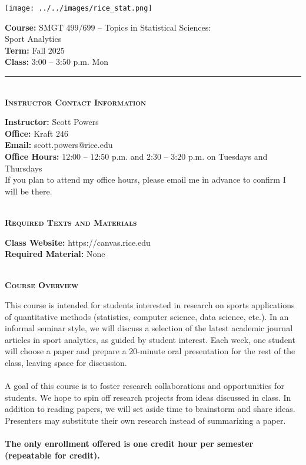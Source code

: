 \documentclass[11pt]{article}
\begin{document}
\begin{minipage}[c]{0.4\linewidth}
  \texttt{[image: ../../images/rice\_stat.png]}
\end{minipage}
\begin{minipage}[c]{0.6\linewidth}
  \raggedleft
  {\bf Course:} SMGT $499/699$ -- Topics in Statistical Sciences:\\
  Sport Analytics\\
  {\bf Term:} Fall $2025$\\
  {\bf Class:} $3$:$00$ -- $3$:$50$ p.m. Mon
\end{minipage}

\hrule

~\\
\textbf{\textsc{Instructor Contact Information}}
\begin{adjustwidth}{1cm}{0cm}
	{\bf Instructor:} Scott Powers\\
  {\bf Office:} Kraft $246$\\
  {\bf Email:} scott.powers@rice.edu\\
  {\bf Office Hours:} $12$:$00$ -- $12$:$50$ p.m. and $2$:$30$ -- $3$:$20$ p.m. on Tuesdays and Thursdays\\
  If you plan to attend my office hours, please email me in advance to confirm I will be there.
\end{adjustwidth}

~\\
\textbf{\textsc{Required Texts and Materials}}
\begin{adjustwidth}{1cm}{0cm}
	{\bf Class Website:} https://canvas.rice.edu\\
	{\bf Required Material:} None
\end{adjustwidth}

~\\
\textbf{\textsc{Course Overview}}
\begin{adjustwidth}{1cm}{0cm}
  This course is intended for students interested in research on sports applications of quantitative methods (statistics, computer science, data science, etc.). In an informal seminar style, we will discuss a selection of the latest academic journal articles in sport analytics, as guided by student interest. Each week, one student will choose a paper and prepare a 20-minute oral presentation for the rest of the class, leaving space for discussion.\\
  ~\\
  A goal of this course is to foster research collaborations and opportunities for students. We hope to spin off research projects from ideas discussed in class. In addition to reading papers, we will set aside time to brainstorm and share ideas. Presenters may substitute their own research instead of summarizing a paper.\\
  ~\\
  {\bf The only enrollment offered is one credit hour per semester (repeatable for credit).}
\end{adjustwidth}
\end{document}
